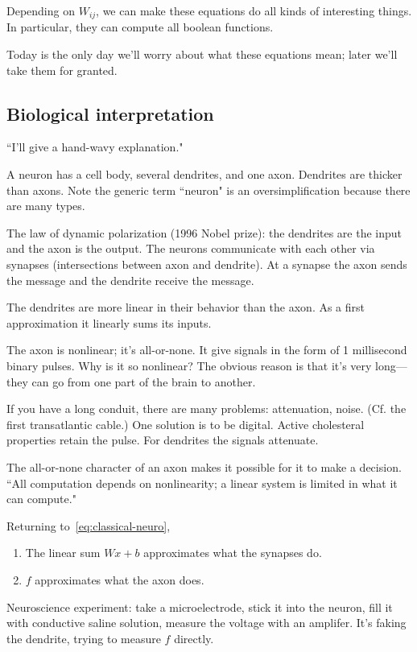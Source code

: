 Depending on $W_{ij}$, we can make these equations do all kinds of interesting things. In particular, they can compute all boolean functions.

Today is the only day we'll worry about what these equations mean; later we'll take them for granted. 

\subsection{Biological interpretation}
``I'll give a hand-wavy explanation."

A neuron has a cell body, several dendrites, and one axon. Dendrites are thicker than axons. Note the generic term ``neuron" is an oversimplification because there are many types.

The law of dynamic polarization (1996 Nobel prize): the dendrites are the input and the axon is the output. The neurons communicate with each other via synapses (intersections between axon and dendrite). At a synapse the axon sends the message and the dendrite receive the message.

The dendrites are more linear in their behavior than the axon. As a first approximation it linearly sums its inputs.


The axon is nonlinear; it's all-or-none. It give signals in the form of 1 millisecond binary pulses. Why is it so nonlinear? The obvious reason is that it's very long---they can go from one part of the brain to another.

If you have a long conduit, there are many problems: attenuation, noise. (Cf. the first transatlantic cable.) One solution is to be digital. Active cholesteral properties retain the pulse. For dendrites the signals attenuate.


The all-or-none character of an axon makes it possible for it to make a decision. ``All computation depends on nonlinearity; a linear system is limited in what it can compute."

Returning to~\eqref{eq:classical-neuro},
\begin{enumerate}
\item
The linear sum $Wx+b$ approximates what the synapses do. 
\item
$f$ approximates what the axon does.
\end{enumerate}

Neuroscience experiment: take a microelectrode, stick it into the neuron, fill it with conductive saline solution, measure the voltage with an amplifer. It's faking the dendrite, trying to measure $f$ directly.

